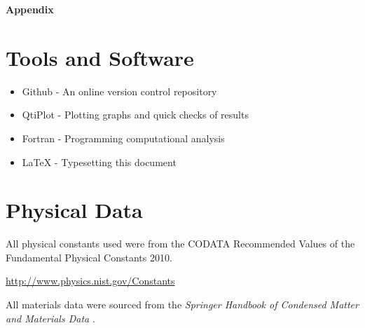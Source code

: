 \documentclass[12pt]{article}
\begin{document}
\pagebreak

\appendix

\begin{center}
{\Huge\textbf{Appendix}}
\end{center}




\section{Tools and Software}

\begin{itemize}
  \item Github - An online version control repository
  \item QtiPlot - Plotting graphs and quick checks of results
  \item Fortran - Programming computational analysis
  \item LaTeX - Typesetting this document
\end{itemize}

\section{Physical Data}
All physical constants used were from the CODATA Recommended Values of the Fundamental Physical Constants 2010.

\url{http://www.physics.nist.gov/Constants}

All materials data were sourced from the \emph{Springer Handbook of Condensed Matter and Materials Data} \cite{springer}.

\end{document}
